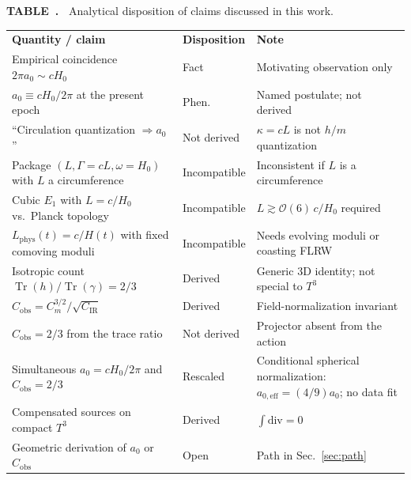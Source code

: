 \documentclass[aps,prd,reprint,superscriptaddress,nofootinbib,floatfix,showkeys]{revtex4-2}
\newcommand{\Tthree}{T^{3}}
\newcommand{\Cobs}{C_{\mathrm{obs}}}
\newcommand{\Cm}{C_{m}}
\newcommand{\CIR}{C_{\mathrm{IR}}}
\newcommand{\azero}{a_{0}}
\newcommand{\Hzero}{H_{0}}
\begin{document}
\begin{minipage}{\textwidth}
\small
\noindent\textbf{TABLE~\thetable.\ }
Analytical disposition of claims discussed in this work.\\[0.55em]
\begin{ruledtabular}
\begin{tabular}{@{}p{}@{\hspace{0.8em}}p{}@{\hspace{0.8em}}p{}@{}}
\textbf{Quantity / claim} & \textbf{Disposition} & \textbf{Note} \\
\colrule
Empirical coincidence \(2\pi\azero\sim c\Hzero\)
  & Fact & Motivating observation only \\
\hline
\(\azero\equiv c\Hzero/2\pi\) at the present epoch
  & Phen. & Named postulate; not derived \\
\hline
``Circulation quantization \(\Rightarrow\azero\)''
  & Not derived & \(\kappa=cL\) is not \(h/m\) quantization \\
\hline
Package \((L,\Gamma=cL,\omega=\Hzero)\) with \(L\) a circumference
  & Incompatible & Inconsistent if \(L\) is a circumference \\
\hline
Cubic \(E_1\) with \(L=c/\Hzero\) vs.\ Planck topology
  & Incompatible & \(L\gtrsim\mathcal{O}(6)\,c/\Hzero\) required \\
\hline
\(L_{\mathrm{phys}}(t)=c/H(t)\) with fixed comoving moduli
  & Incompatible & Needs evolving moduli or coasting FLRW \\
\hline
Isotropic count \(\operatorname{Tr}(h)/\operatorname{Tr}(\gamma)=2/3\)
  & Derived & Generic 3D identity; not special to \(\Tthree\) \\
\hline
\(\Cobs=\Cm^{3/2}/\sqrt{\CIR}\)
  & Derived & Field-normalization invariant \\
\hline
\(\Cobs=2/3\) from the trace ratio
  & Not derived & Projector absent from the action \\
\hline
Simultaneous \(\azero=c\Hzero/2\pi\) and \(\Cobs=2/3\)
  & Rescaled & Conditional spherical normalization: \(a_{0,\mathrm{eff}}=(4/9)\azero\); no data fit \\
\hline
Compensated sources on compact \(\Tthree\)
  & Derived & \(\int\mathrm{div}=0\) \\
\hline
Geometric derivation of \(\azero\) or \(\Cobs\)
  & Open & Path in Sec.~\ref{sec:path} \\
\end{tabular}
\end{ruledtabular}
\end{minipage}
\vspace{1.0em}
\twocolumngrid
\end{document}
